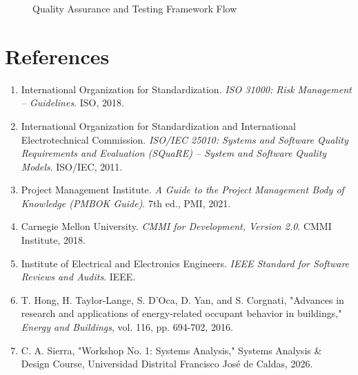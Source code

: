 \documentclass[12pt,a4paper]{article}
\begin{document}
\begin{figure}[H]
\centering
{}
\caption{Quality Assurance and Testing Framework Flow}
\label{fig:qa_flow_detailed}
\end{figure}

\section{References}
\begin{enumerate}
    \item International Organization for Standardization. \textit{ISO 31000: Risk Management -- Guidelines}. ISO, 2018.
    \item International Organization for Standardization and International Electrotechnical Commission. \textit{ISO/IEC 25010: Systems and Software Quality Requirements and Evaluation (SQuaRE) -- System and Software Quality Models}. ISO/IEC, 2011.
    \item Project Management Institute. \textit{A Guide to the Project Management Body of Knowledge (PMBOK Guide)}. 7th ed., PMI, 2021.
    \item Carnegie Mellon University. \textit{CMMI for Development, Version 2.0}. CMMI Institute, 2018.
    \item Institute of Electrical and Electronics Engineers. \textit{IEEE Standard for Software Reviews and Audits}. IEEE.
    \item T. Hong, H. Taylor-Lange, S. D'Oca, D. Yan, and S. Corgnati, "Advances in research and applications of energy-related occupant behavior in buildings," \textit{Energy and Buildings}, vol. 116, pp. 694-702, 2016.
    \item C. A. Sierra, "Workshop No. 1: Systems Analysis," Systems Analysis \& Design Course, Universidad Distrital Francisco José de Caldas, 2026.
\end{enumerate}
\end{document}
